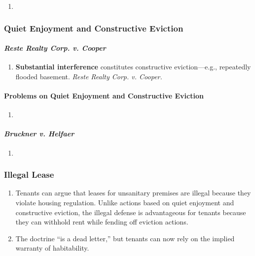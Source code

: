 \begin{enumerate}
    \item
\end{enumerate}

\subsubsection{Quiet Enjoyment and Constructive Eviction} %

\paragraph{\emph{Reste Realty Corp. v. Cooper}} %

\begin{enumerate}
    \item \textbf{Substantial interference} constitutes constructive 
    eviction---e.g., repeatedly flooded basement. \emph{Reste Realty Corp. v. 
    Cooper.}
\end{enumerate}

\paragraph{Problems on Quiet Enjoyment and Constructive Eviction}

\begin{enumerate}
    \item 
\end{enumerate}

\paragraph{\emph{Bruckner v. Helfaer}} %

\begin{enumerate}
    \item
\end{enumerate}

\subsubsection{Illegal Lease} %

\begin{enumerate}
    \item Tenants can argue that leases for unsanitary premises are illegal 
    because they violate housing regulation. Unlike actions based on quiet 
    enjoyment and constructive eviction, the illegal defense is advantageous 
    for tenants because they can withhold rent while fending off eviction 
    actions.
    \item The doctrine ``is a dead letter,'' but tenants can now rely on the 
    implied warranty of habitability. %
\end{enumerate}

